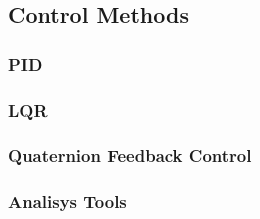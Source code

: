 \subsection{Control Methods}
    
    \subsubsection{PID}
    
    \subsubsection{LQR}

    \subsubsection{Quaternion Feedback Control}
    
    \subsubsection{Analisys Tools}